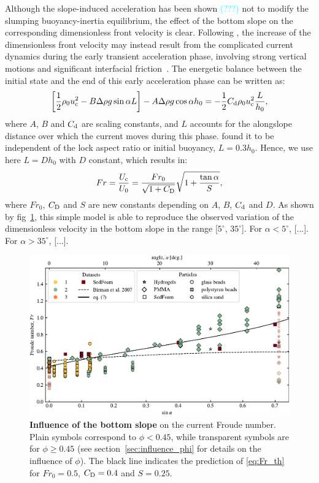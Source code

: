 \documentclass[twocolumn]{article}
\newcommand*{\marie}{\textcolor{Cyan}}
\begin{document}
\medskip
Although the slope-induced acceleration has been shown \marie{(???)} not to modify the slumping buoyancy-inertia equilibrium, the effect of the bottom slope on the corresponding dimensionless front velocity is clear.
Following \citet{Gadal2023}, the increase of the dimensionless front velocity may instead result from the complicated current dynamics during the early transient acceleration phase, involving strong vertical motions and significant interfacial friction~\citep{Cantero2007}. The energetic balance between the initial state and the end of this early acceleration phase can be written as:
\begin{equation}
	\label{eq:energetic_balance}
	\left[\frac{1}{2}\rho_{0}u_{\rm c}^{2} - B \Delta\rho g \sin\alpha L\right] - A \Delta\rho g \cos\alpha h_{0} =  - \frac{1}{2}C_{\rm d}\rho_{0}u_{\rm c}^{2} \frac{L}{h_{0}},
\end{equation}
where $A$, $B$ and $C_{\rm d}$ are scaling constants, and $L$ accounts for the alongslope distance over which the current moves during this phase. \citet{Cantero2007} found it to be independent of the lock aspect ratio or initial buoyancy, $L = 0.3 h_{0}$. Hence, we use here $L = D h_{0}$ with $D$ constant, which results in:
\begin{equation}
	\label{eq:Fr_th}
	Fr = \frac{U_{\rm c}}{U_0} = \frac{Fr_0}{\sqrt{1 + C_{\rm D}}} \sqrt{1 + \frac{\tan\alpha}{S}},
\end{equation}
where $Fr_0$, $C_{\rm D}$ and $S$ are new constants depending on $A$, $B$, $C_{\rm d}$ and $D$. As shown by fig~\ref{fig:fig4}, this simple model is able to reproduce the observed variation of the dimensionless velocity in the bottom slope in the range [$5^\circ$, $35^\circ$]. For $\alpha < 5^\circ$, [...]. For $\alpha > 35^\circ$, [...].

\begin{figure}[ht]
	\centering
	\includegraphics{figure4.pdf}
	\caption{\textbf{Influence of the bottom slope} on the current Froude number. Plain symbols correspond to $\phi < 0.45$, while transparent symbols are for $\phi \geq 0.45$ (see section~\ref{sec:influence_phi} for details on the influence of $\phi$). The black line indicates the prediction of \eqref{eq:Fr_th} for $Fr_{0} = 0.5$, $C_{\rm D} = 0.4$ and $S = 0.25$.}
	\label{fig:fig4}
\end{figure}
\end{document}
